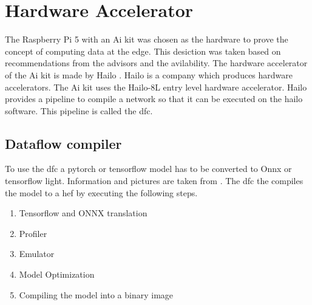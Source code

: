 \chapter{Hardware Accelerator}

The Raspberry Pi 5 with an Ai kit was chosen as the hardware to prove the concept of computing data at the edge.
This desiction was taken based on recommendations from the advisors and the avilability.
The hardware accelerator of the Ai kit is made by Hailo \cite{hailo}.
Hailo is a company which produces hardware accelerators.
The Ai kit uses the Hailo-8L entry level hardware accelerator.
Hailo provides a pipeline to compile a network so that it can be executed on the hailo software.
This pipeline is  called the \Acrfull{dfc}.

\section{Dataflow compiler}

To use the \acrshort{dfc} a pytorch or tensorflow model has to be converted to Onnx or tensorflow light.
Information and pictures are taken from \cite{hailo_dataflow_compiler}.
The \acrshort{dfc} the compiles the model to a \Acrfull{hef} by executing the following steps.
\begin{enumerate}
    \item Tensorflow and ONNX translation
    \item Profiler
    \item Emulator
    \item Model Optimization
    \item Compiling the model into a binary image
\end{enumerate}



